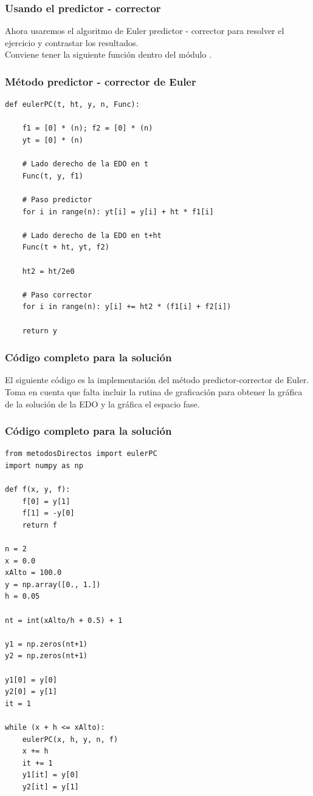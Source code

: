 \documentclass[12pt]{beamer}
\begin{document}
\begin{frame}
\frametitle{Usando el predictor - corrector}
Ahora usaremos el algoritmo de Euler predictor - corrector para resolver el ejercicio y contrastar los resultados.
\\
\bigskip
\pause
Conviene tener la siguiente función dentro del módulo .
\end{frame}
\begin{frame}
\frametitle{Método predictor - corrector de Euler}
\begin{lstlisting}[caption=Método predictor - corrector de Euler]
def eulerPC(t, ht, y, n, Func):

    f1 = [0] * (n); f2 = [0] * (n)
    yt = [0] * (n)
 
    # Lado derecho de la EDO en t
    Func(t, y, f1)

    # Paso predictor
    for i in range(n): yt[i] = y[i] + ht * f1[i]
    
    # Lado derecho de la EDO en t+ht
    Func(t + ht, yt, f2)
 
    ht2 = ht/2e0

    # Paso corrector
    for i in range(n): y[i] += ht2 * (f1[i] + f2[i])
    
    return y
\end{lstlisting}
\end{frame}
\begin{frame}
\frametitle{Código completo para la solución}
El siguiente código es la implementación del método predictor-corrector de Euler.
\\
\bigskip
\pause
Toma en cuenta que falta incluir la rutina de graficación para obtener la gráfica de la solución de la EDO y la gráfica el espacio fase.
\end{frame}
\begin{frame}
\frametitle{Código completo para la solución}
\begin{lstlisting}[caption=Código completo con el método predictor-corrector de Euler]
from metodosDirectos import eulerPC
import numpy as np

def f(x, y, f):
    f[0] = y[1]
    f[1] = -y[0]
    return f

n = 2
x = 0.0
xAlto = 100.0
y = np.array([0., 1.])
h = 0.05

nt = int(xAlto/h + 0.5) + 1

y1 = np.zeros(nt+1)
y2 = np.zeros(nt+1)

y1[0] = y[0]
y2[0] = y[1]
it = 1

while (x + h <= xAlto):
    eulerPC(x, h, y, n, f)
    x += h
    it += 1
    y1[it] = y[0]
    y2[it] = y[1]
\end{lstlisting}
\end{frame}
\end{document}
